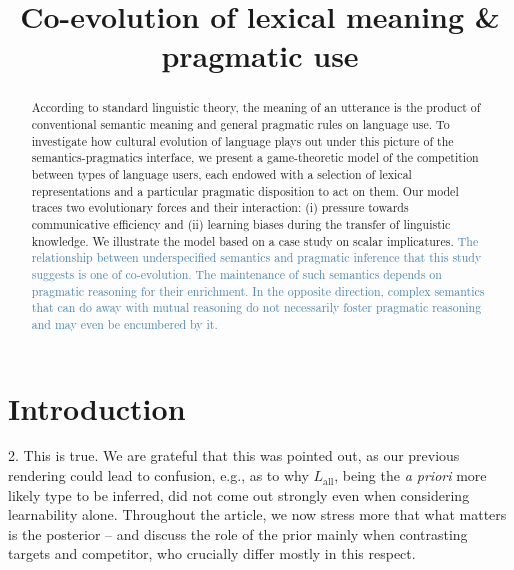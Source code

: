 \documentclass[a4paper, 11pt]{article}
\title{Co-evolution of lexical meaning \& pragmatic use}
\date{}
\theoremstyle{Satz}
\newcommand{\hl}[1]{\textcolor[rgb]{.8,.33,.0}{#1}}%
\newcommand{\rvv}[1]{\textcolor{Steelblue}{#1}}%
\begin{document}

\maketitle

\begin{abstract}
 According to standard linguistic theory, the meaning of an utterance is the product of
  conventional semantic meaning and general pragmatic rules on language use. To investigate how
  cultural evolution of language plays out under this picture of the semantics-pragmatics
  interface, we present a game-theoretic model of the competition between types of language
  users, each endowed with a selection of lexical representations and a particular pragmatic
  disposition to act on them. Our model traces two evolutionary forces and their interaction:
  (i) pressure towards communicative efficiency and (ii) learning biases during the transfer of
  linguistic knowledge. We illustrate the model based on a case study on scalar
  implicatures. \rvv{The relationship between underspecified semantics and pragmatic inference that this study suggests is one of co-evolution. The maintenance of such semantics depends on pragmatic reasoning for their enrichment. In the opposite direction, complex semantics that can do away with mutual reasoning do not necessarily foster pragmatic reasoning and may even be encumbered by it.}
\end{abstract}

\section{Introduction}\label{sec:introduction}
\hl{2. This is true. We are grateful that this was pointed out, as our previous rendering could lead to confusion, e.g., as to why $L_{\text{all}}$, being the {\em a priori} more likely type to be inferred, did not come out strongly even when considering learnability alone. Throughout the article, we now stress more that what matters is the posterior -- and discuss the role of the prior mainly when contrasting targets and competitor, who crucially differ mostly in this respect.}
\end{document}
